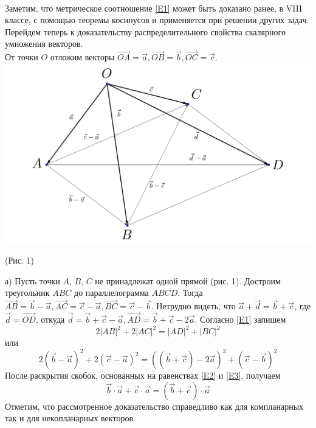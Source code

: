 \documentclass{article}
\begin{document}
\\Заметим, что метрическое соотношение \eqref{E1} может быть доказано ранее, в VIII классе, с помощью теоремы косинусов и применяется при решении других задач.
\\Перейдем теперь к доказательству распределительного свойства скалярного умножения векторов.
\\От точки $O$ отложим векторы $\overrightarrow{OA}=\overrightarrow{a},\overrightarrow{OB}=\overrightarrow{b},\overrightarrow{OC}=\overrightarrow{c}$.
\\
\includegraphics[scale=0.25]{vector1.png}
\begin{center}
(Рис. 1)
\end{center}
а) Пусть точки $A$, $B$, $C$ не принадлежат одной прямой (рис. 1). Достроим треугольник $ABC$ до параллелограмма $ABCD$. Тогда $\overrightarrow{AB}=\overrightarrow{b}-\overrightarrow{a}, \overrightarrow{AC}=\overrightarrow{c}-\overrightarrow{a}, \overrightarrow{BC}=\overrightarrow{c}-\overrightarrow{b}$. Нетрудно видеть, что $\overrightarrow{a}+\overrightarrow{d}=\overrightarrow{b}+\overrightarrow{c}$, где $\overrightarrow{d}=\overrightarrow{OD}$, откуда $\overrightarrow{d}=\overrightarrow{b}+\overrightarrow{c}-\overrightarrow{a}, \overrightarrow{AD}=\overrightarrow{b}+\overrightarrow{c}-2\overrightarrow{a}$. Согласно \eqref{E1} запишем
$$2|AB|^2+2|AC|^2=|AD|^2+|BC|^2$$
или
$$2(\overrightarrow{b}-\overrightarrow{a})^2+2(\overrightarrow{c}-\overrightarrow{a})^2=((\overrightarrow{b}+\overrightarrow{c})-2\overrightarrow{a})^2+(\overrightarrow{c}-\overrightarrow{b})^2$$
После раскрытия скобок, основанных на равенствах \eqref{E2} и \eqref{E3}, получаем
$$\overrightarrow{b}\cdot\overrightarrow{a}+\overrightarrow{c}\cdot\overrightarrow{a}=(\overrightarrow{b}+\overrightarrow{c})\cdot\overrightarrow{a}$$
Отметим, что рассмотренное доказательство справедливо как для компланарных так и для некопланарных векторов.
\end{document}
